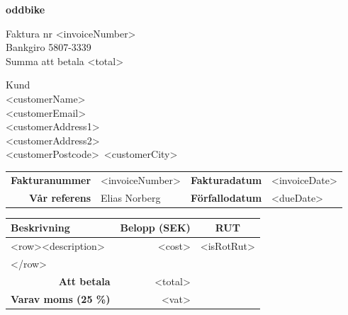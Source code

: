 \documentclass[a4paper,11pt]{extarticle}
\newcommand{\changefont}{%
        \fontsize{9}{11}\selectfont
    }
\begin{document}
\pagestyle{fancy}
\fancyhf{} %
\renewcommand{\headrulewidth}{0pt}
\renewcommand{\footrulewidth}{0pt}

\setlength{\fboxsep}{1.5em}
\setlength{\parindent}{0pt}

{\color{OliveGreen}
\fontsize{48}{0}\selectfont
\hspace{-0.6em}
\textbf{
oddbike}}

\vspace{2em}
\begin{minipage}[t]{0.45\textwidth}
{\huge
    Faktura nr <invoiceNumber>}\\
{\large
    Bankgiro 5807-3339 \\
    Summa att betala <total>\\
}
    \vspace{2em}
\end{minipage}
\begin{minipage}[t]{0.3\textwidth}
{\huge Kund}\\
<customerName>\\
<customerEmail>\\
<customerAddress1>\\
<customerAddress2>\\
<customerPostcode>~<customerCity>\\
\end{minipage}

\renewcommand\arraystretch{1.5}
\begin{tabular*}{\linewidth}{rlrl}
\hline
    \textbf{Fakturanummer} & <invoiceNumber> & \textbf{Fakturadatum} & <invoiceDate> \\
    \textbf{Vår referens} & Elias Norberg & \textbf{Förfallodatum} & <dueDate> \\
\hline
\end{tabular*}

\begin{tabularx}{\textwidth}{Xrc}
\rowcolor{Gray}
\changefont \textbf{Beskrivning} &
\multicolumn{1}{l}{\changefont \textbf{Belopp (SEK)}} &
\changefont \textbf{RUT}\\
\hline
    <row><description> & <cost> & <isRotRut>\\
    </row>
    & & \\
\hline
    \multicolumn{1}{r}{\textbf{Att betala}} & <total> \\
    \multicolumn{1}{r}{\textbf{Varav moms (25 \%)}} & <vat> \\
\hline
\end{tabularx}
\end{document}
